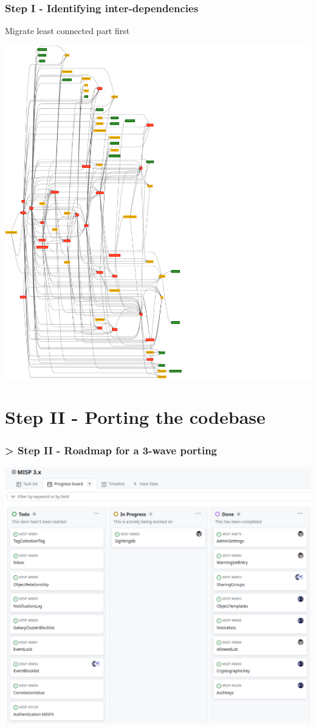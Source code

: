 \begin{frame}
    \frametitle{Step I - Identifying inter-dependencies}
    Migrate least connected part first
    \begin{center}
        \includegraphics[scale=0.06,angle=-90,origin=c]{pictures/controller-dep.png} 
    \end{center}
\end{frame}


\section{Step II - Porting the codebase}
\begin{frame}
    \frametitle{> Step II - Roadmap for a 3-wave porting}
    \begin{center}
        \includegraphics[width=0.99\linewidth]{pictures/misp3-github-project.png}
    \end{center}
\end{frame}

